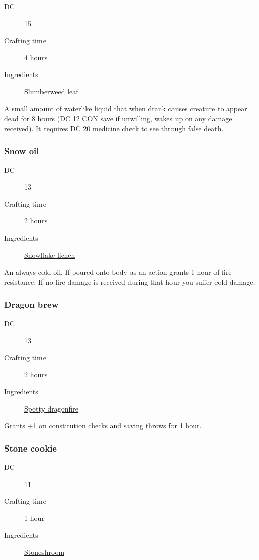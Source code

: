 \begin{description}
\item [DC] 15
\item [Crafting time] 4 hours
\item [Ingredients] \hyperref[Slumberweed]{Slumberweed leaf}
\end{description}

A small amount of waterlike liquid that when drank causes creature to appear dead for 
8 hours (DC 12 CON save if unwilling, wakes up on any damage received). 
It requires DC 20 medicine check to see through false death.

\subsubsection{Snow oil}
\label{Snow oil}

\begin{description}
\item [DC] 13
\item [Crafting time] 2 hours
\item [Ingredients] \hyperref[Snowflake Lichen]{Snowflake lichen}
\end{description}

An always cold oil. If poured onto body as an action grants 1 hour of fire resistance. 
If no fire damage is received during that hour you suffer  cold damage.

\subsubsection{Dragon brew}
\label{Dragon brew}

\begin{description}
\item [DC] 13
\item [Crafting time] 2 hours
\item [Ingredients] \hyperref[Spotty Dragonfire]{Spotty dragonfire}
\end{description}

Grants +1 on constitution checks and saving throws for 1 hour.

\subsubsection{Stone cookie}
\label{Stone cookie}

\begin{description}
\item [DC] 11
\item [Crafting time] 1 hour
\item [Ingredients] \hyperref[Stoneshroom]{Stoneshroom}
\end{description}

